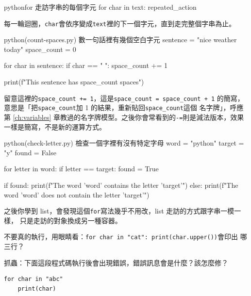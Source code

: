 \begin{code}{python}{for 走訪字串的每個字元}
for char in text:
    repeated_action
\end{code}

每一輪迴圈，\texttt{char}會依序變成\texttt{text}裡的下一個字元，直到走完整個字串為止。

\begin{example}{python}{(count-spaces.py) 數一句話裡有幾個空白字元}
sentence = "nice weather today"
space_count = 0

for char in sentence:
    if char == " ":
        space_count += 1

print(f"This sentence has {space_count} spaces")
\end{example}


留意這裡的\texttt{space\_count += 1}，這是\texttt{space\_count = space\_count + 1}
的簡寫，意思是「把\texttt{space\_count}加 1 的結果，重新貼回\texttt{space\_count}這個
名字牌」，呼應第 \ref{ch:variables} 章教過的名字牌模型。之後你會常看到的\texttt{-=}則是減法版本，效果
一樣是簡寫，不是新的運算方式。

\begin{example}{python}{(check-letter.py) 檢查一個字裡有沒有特定字母}
word = "python"
target = "y"
found = False

for letter in word:
    if letter == target:
        found = True

if found:
    print(f"The word '{word}' contains the letter '{target}'")
else:
    print(f"The word '{word}' does not contain the letter '{target}'")
\end{example}



之後你學到 list，會發現這個\texttt{for}寫法幾乎不用改，list 走訪的方式跟字串一模一樣，
只是走訪的對象換成另一種容器。

\begin{drills}[label=drills:for-string]
\item 不要真的執行，用眼睛看：\texttt{for char in "cat": print(char.upper())}會印出
哪三行？
\item 抓蟲：下面這段程式碼執行後會出現錯誤，錯誤訊息會是什麼？該怎麼修？
\begin{verbatim}
for char in "abc"
    print(char)
\end{verbatim}
\end{drills}

